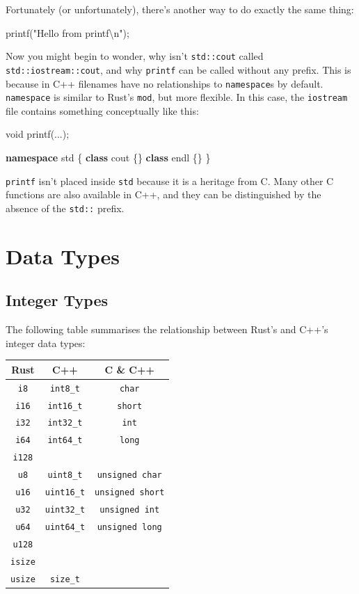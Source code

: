 \documentclass[
]{book}
\newenvironment{Shaded}{\begin{snugshade}}{\end{snugshade}}
\newcommand{\DataTypeTok}[1]{\textcolor[rgb]{0.13,0.29,0.53}{#1}}
\newcommand{\KeywordTok}[1]{\textcolor[rgb]{0.13,0.29,0.53}{\textbf{#1}}}
\newcommand{\NormalTok}[1]{#1}
\newcommand{\SpecialCharTok}[1]{\textcolor[rgb]{0.00,0.00,0.00}{#1}}
\newcommand{\StringTok}[1]{\textcolor[rgb]{0.31,0.60,0.02}{#1}}
\begin{document}
Fortunately (or unfortunately), there's another way to do exactly the same thing:

\begin{Shaded}
\begin{Highlighting}[]
\NormalTok{printf(}\StringTok{"Hello from printf}\SpecialCharTok{\textbackslash{}n}\StringTok{"}\NormalTok{);}
\end{Highlighting}
\end{Shaded}

Now you might begin to wonder, why isn't \texttt{std::cout} called \texttt{std::iostream::cout}, and why \texttt{printf} can be called without any prefix. This is because in C++ filenames have no relationships to \texttt{namespace}s by default. \texttt{namespace} is similar to Rust's \texttt{mod}, but more flexible. In this case, the \texttt{iostream} file contains something conceptually like this:

\begin{Shaded}
\begin{Highlighting}[]
\DataTypeTok{void}\NormalTok{ printf(...);}

\KeywordTok{namespace}\NormalTok{ std \{}
    \KeywordTok{class}\NormalTok{ cout \{\}}
    \KeywordTok{class}\NormalTok{ endl \{\}}
\NormalTok{\}}
\end{Highlighting}
\end{Shaded}

\texttt{printf} isn't placed inside \texttt{std} because it is a heritage from C. Many other C functions are also available in C++, and they can be distinguished by the absence of the \texttt{std::} prefix.

\hypertarget{data-types}{%
\section{Data Types}\label{data-types}}

\hypertarget{integer-types}{%
\subsection{Integer Types}\label{integer-types}}

The following table summarises the relationship between Rust's and C++'s integer data types:

\begin{longtable}[]{@{}ccc@{}}
\toprule
Rust & C++ & C \& C++\tabularnewline
\midrule
\endhead
\texttt{i8} & \texttt{int8\_t} & \texttt{char}\tabularnewline
\texttt{i16} & \texttt{int16\_t} & \texttt{short}\tabularnewline
\texttt{i32} & \texttt{int32\_t} & \texttt{int}\tabularnewline
\texttt{i64} & \texttt{int64\_t} & \texttt{long}\tabularnewline
\texttt{i128} & &\tabularnewline
\texttt{u8} & \texttt{uint8\_t} & \texttt{unsigned\ char}\tabularnewline
\texttt{u16} & \texttt{uint16\_t} & \texttt{unsigned\ short}\tabularnewline
\texttt{u32} & \texttt{uint32\_t} & \texttt{unsigned\ int}\tabularnewline
\texttt{u64} & \texttt{uint64\_t} & \texttt{unsigned\ long}\tabularnewline
\texttt{u128} & &\tabularnewline
\texttt{isize} & &\tabularnewline
\texttt{usize} & \texttt{size\_t} &\tabularnewline
\bottomrule
\end{longtable}
\end{document}
